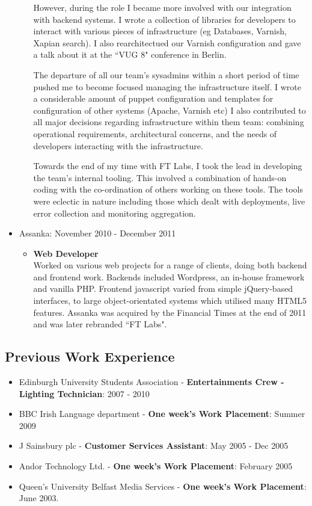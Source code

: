 \documentclass[a4paper]{article}
\begin{document}
\begin{itemize}
\begin{itemize}
However, during the role I became more involved with our integration with backend systems. I wrote a collection of libraries for developers to interact with various pieces of infrastructure (eg Databases, Varnish, Xapian search). I also rearchitectued our Varnish configuration and gave a talk about it at the ``VUG 8" conference in Berlin.\par

The departure of all our team's sysadmins within a short period of time pushed me to become focused managing the infrastructure itself.  I wrote a considerable amount of puppet configuration and  templates for configuration of other systems (Apache, Varnish etc) I also contributed to all major decisions regarding infrastructure within them team: combining operational requirements, architectural concerns, and the needs of developers interacting with the infrastructure.\par

Towards the end of my time with FT Labs, I took the lead in developing the team's internal tooling.  This involved a combination of hands-on coding with the co-ordination of others working on these tools.  The tools were eclectic in nature including those which dealt with deployments, live error collection and monitoring aggregation.
\end{itemize}

\item Assanka: November 2010 - December 2011
\begin{itemize}
\item {\bf Web Developer}\\
Worked on various web projects for a range of clients, doing both backend and frontend work. Backends included Wordpress, an in-house framework and vanilla PHP. Frontend javascript varied from simple jQuery-based interfaces, to large object-orientated systems which utilised many HTML5 features.
Assanka was acquired by the Financial Times at the end of 2011 and was later rebranded ``FT Labs".
\end{itemize}

\end{itemize}

\subsection*{Previous Work Experience}
\begin{itemize}

\item Edinburgh University Students Association - {\bf Entertainments Crew - Lighting Technician}: 2007 - 2010
\item BBC Irish Language department - {\bf One week's Work Placement}: Summer 2009
\item J Sainsbury plc - {\bf Customer Services Assistant}: May 2005 - Dec 2005
\item Andor Technology Ltd. - {\bf One week's Work Placement}:  February 2005
\item Queen's University Belfast Media Services - {\bf One week's Work Placement}:  June 2003.


\end{itemize}
\end{document}

